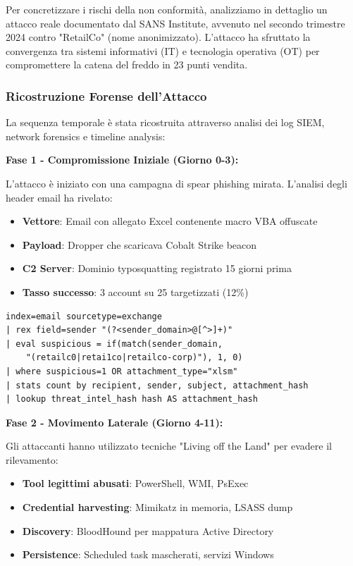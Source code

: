 Per concretizzare i rischi della non conformità, analizziamo in dettaglio un attacco reale documentato dal SANS Institute, avvenuto nel secondo trimestre 2024 contro "RetailCo" (nome anonimizzato)\autocite{SANS2024}. L'attacco ha sfruttato la convergenza tra sistemi informativi (IT) e tecnologia operativa (OT) per compromettere la catena del freddo in 23 punti vendita.

\subsubsection{Ricostruzione Forense dell'Attacco}

La sequenza temporale è stata ricostruita attraverso analisi dei log SIEM, network forensics e timeline analysis:

\textbf{Fase 1 - Compromissione Iniziale (Giorno 0-3):}

L'attacco è iniziato con una campagna di spear phishing mirata. L'analisi degli header email ha rivelato:
\begin{itemize}
    \item \textbf{Vettore}: Email con allegato Excel contenente macro VBA offuscate
    \item \textbf{Payload}: Dropper che scaricava Cobalt Strike beacon
    \item \textbf{C2 Server}: Dominio typosquatting registrato 15 giorni prima
    \item \textbf{Tasso successo}: 3 account su 25 targetizzati (12\%)
\end{itemize}

\begin{lstlisting}[caption={Query Splunk per Detection Phishing},label={lst:splunk_phishing}]
index=email sourcetype=exchange
| rex field=sender "(?<sender_domain>@[^>]+)"
| eval suspicious = if(match(sender_domain, 
    "(retailc0|retai1co|retailco-corp)"), 1, 0)
| where suspicious=1 OR attachment_type="xlsm"
| stats count by recipient, sender, subject, attachment_hash
| lookup threat_intel_hash hash AS attachment_hash
\end{lstlisting}

\textbf{Fase 2 - Movimento Laterale (Giorno 4-11):}

Gli attaccanti hanno utilizzato tecniche "Living off the Land" per evadere il rilevamento:
\begin{itemize}
    \item \textbf{Tool legittimi abusati}: PowerShell, WMI, PsExec
    \item \textbf{Credential harvesting}: Mimikatz in memoria, LSASS dump
    \item \textbf{Discovery}: BloodHound per mappatura Active Directory
    \item \textbf{Persistence}: Scheduled task mascherati, servizi Windows
\end{itemize}

